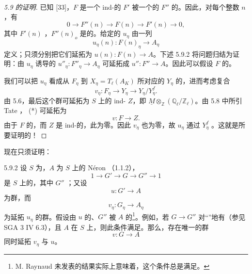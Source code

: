\begin{proof}[5.9 的证明]
已知 [33]，$F$ 是一个 ind-的  $F'$ 被一个的  $F''$ 的。因此，对每个整数 $n$，有
\[
0\longrightarrow F''(n)\longrightarrow F(n)\longrightarrow F'(n)\longrightarrow0,
\]
其中 $F'(n)$ ，$F''(n)_o$ 是的。给定的 $u_\eta$ 由一列
\[
u_\eta(n):F(n)_\eta\longrightarrow A_\eta
\]
定义；只须分别把它们延拓为 $u(n):F(n)\to A$。下述 5.9.2 将问题归结为证明：由 $u_\eta$ 诱导的 $u''_\eta:F''_\eta\to A_\eta$ 可延拓成 $u'':F''\to A$。因此可以假设 $F$ 的。

我们可以把 $u_\eta$ 看成从 $F_\eta$ 到 $X_\eta=T_\ell(A_K)$ 所对应的  $Y_\eta$ 的，进而考虑复合
\[
v_\eta:F_\eta\longrightarrow Y_\eta\longrightarrow Y_\eta/Y_\eta^f.\tag{*}
\]
由 5.6，最后这个群可延拓为 $S$ 上的 ind-  $Z$，即 $\underline M\otimes_{\mathbb Z}(\mathbb Q_\ell/\mathbb Z_\ell)$。由 5.8 中所引 Tate ， (*) 可延拓为
\[
v:F\longrightarrow Z.
\]
由于 $F$ 的，而 $Z$ 是 ind-的，此为零。因此 $v_\eta$ 也为零，故 $u_\eta$ 通过 $Y_\eta^f$ 。这就是所要证明的！
\end{proof}
现在只须证明：
\begin{SGAresult}{}{5.9.2}
设 $S$ 为，$A$ 为 $S$ 上的 Néron （1.1.2），
\[
1\longrightarrow G'\longrightarrow G\longrightarrow G''\longrightarrow1
\]
是 $S$ 上的，其中 $G''$ ；又设
\[
u:G'\longrightarrow A
\]
为群，而
\[
v_\eta:G_\eta\longrightarrow A_\eta
\]
为延拓 $u_\eta$ 的群。假设由 $u$ 的、$G''$ 被 $A$ 的\footnote{M. Raynaud 未发表的结果实际上意味着，这个条件总是满足。}。例如，若 $G\to G''$ 对“”地有（参见 SGA 3 IV 6.3），且 $A$ 在 $S$ 上，则此条件满足。那么，存在唯一的群
\[
v:G\longrightarrow A
\]
同时延拓 $v_\eta$ 与 $u$。
\end{SGAresult}
